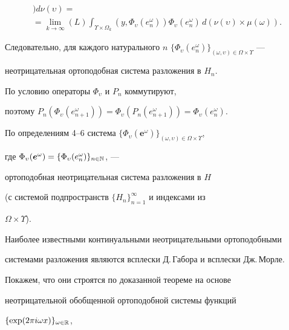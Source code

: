 \begin{pf}
\begin{gather*}
)d\nu(\upsilon)= \\


%


=\lim_{k\to\infty} (L)\int_{\Upsilon\times\Omega_k}


(y,\Phi_\upsilon(e^\omega_n))\Phi_\upsilon(e^\omega_n)\,d(\nu(\upsilon


)\times\mu(\omega)).


\end{gather*}


Следовательно, для каждого натурального $n$\; $\{\Phi_\upsilon


(e^\omega_n)\}_{(\omega,\upsilon)\in\Omega\times\Upsilon}$ ---


неотрицательная ортоподобная система разложения в $H_n$.





По условию операторы $\Phi_\upsilon$ и $P_n$ коммутируют,


поэтому $P_n(\Phi_\upsilon(e^\omega_{n+1}))=\Phi_\upsilon


(P_n(e^\omega_{n+1}))=\Phi_\upsilon(e^\omega_n)$.





По определениям 4--6 система $\{\Phi_\upsilon(\boldsymbol


e^\omega)\}_{(\omega,\upsilon)\in\Omega\times\Upsilon}$,


где $\Phi_\upsilon(\boldsymbol e^\omega)=\{\Phi_\upsilon(e^\omega_n)


\}_{n\in\Bbb N}$, ---


ортоподобная неотрицательная система разложения в $H$


(с системой подпространств $\{H_n\}_{n=1}^\infty$ и индексами из


$\Omega\times\Upsilon$).


\end{pf}





Наиболее известными континуальными неотрицательными ортоподобными


системами разложения являются всплески Д.\,Габора и всплески Дж.\,Морле.


Покажем, что они строятся по доказанной теореме на основе


неотрицательной обобщенной ортоподобной системы функций


$\{\exp(2\pi i\omega x)\}_{\omega\in\Bbb R}$,


